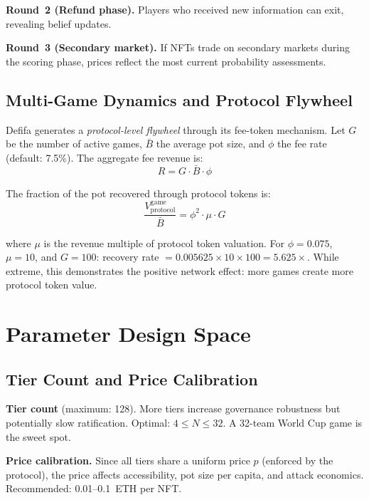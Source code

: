 \documentclass[11pt,a4paper]{article}
\begin{document}
\textbf{Round~2 (Refund phase).} Players who received new information can exit, revealing belief updates.

\textbf{Round~3 (Secondary market).} If NFTs trade on secondary markets during the scoring phase, prices reflect the most current probability assessments.

\subsection{Multi-Game Dynamics and Protocol Flywheel}

Defifa generates a \emph{protocol-level flywheel} through its fee-token mechanism. Let $G$ be the number of active games, $\bar{B}$ the average pot size, and $\phi$ the fee rate (default: 7.5\%). The aggregate fee revenue is:
\begin{equation}
R = G \cdot \bar{B} \cdot \phi
\end{equation}

The fraction of the pot recovered through protocol tokens is:
\begin{equation}
\frac{V_{\text{protocol}}^{\text{game}}}{\bar{B}} = \phi^2 \cdot \mu \cdot G
\end{equation}

where $\mu$ is the revenue multiple of protocol token valuation. For $\phi = 0.075$, $\mu = 10$, and $G = 100$: recovery rate $= 0.005625 \times 10 \times 100 = 5.625\times$. While extreme, this demonstrates the positive network effect: more games create more protocol token value.

\section{Parameter Design Space}

\subsection{Tier Count and Price Calibration}

\textbf{Tier count} (maximum: 128). More tiers increase governance robustness but potentially slow ratification. Optimal: $4 \leq N \leq 32$. A 32-team World Cup game is the sweet spot.

\textbf{Price calibration.} Since all tiers share a uniform price $p$ (enforced by the protocol), the price affects accessibility, pot size per capita, and attack economics. Recommended: 0.01--0.1~ETH per NFT.
\end{document}
